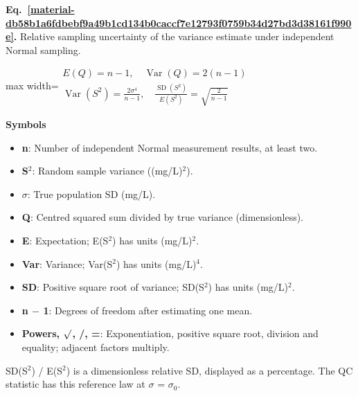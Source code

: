 \documentclass[11pt,a4paper]{article}
\begin{document}
\par\medskip
\begin{samepage}
\label{material-db58b1a6fdbebf9a49b1cd134b0caccf7e12793f0759b34d27bd3d38161f990e}
\noindent\textbf{Eq.~\ref*{material-db58b1a6fdbebf9a49b1cd134b0caccf7e12793f0759b34d27bd3d38161f990e}.} Relative sampling uncertainty of the variance estimate under independent Normal sampling.\par\nopagebreak
\begin{center}\begin{adjustbox}{max width=\linewidth}$\displaystyle \begin{gathered}E(Q)=n-1,\quad\operatorname{Var}(Q)=2(n-1)\\\operatorname{Var}(S^2)=\frac{2\sigma^4}{n-1},\quad\frac{\operatorname{SD}(S^2)}{E(S^2)}=\sqrt{\frac{2}{n-1}}\end{gathered}$\end{adjustbox}\end{center}

\par\noindent\textbf{Symbols}

\begin{itemize}\setlength{\itemsep}{1pt}\setlength{\parsep}{0pt}
\item \textbf{n}: Number of independent Normal measurement results, at least two.
\item \textbf{S\ensuremath{{}^2}}: Random sample variance ((mg/L)\ensuremath{{}^2}).
\item \textbf{\ensuremath{\sigma}}: True population SD (mg/L).
\item \textbf{Q}: Centred squared sum divided by true variance (dimensionless).
\item \textbf{E}: Expectation; E(S\ensuremath{{}^2}) has units (mg/L)\ensuremath{{}^2}.
\item \textbf{Var}: Variance; Var(S\ensuremath{{}^2}) has units (mg/L)\ensuremath{{}^4}.
\item \textbf{SD}: Positive square root of variance; SD(S\ensuremath{{}^2}) has units (mg/L)\ensuremath{{}^2}.
\item \textbf{n \ensuremath{-} 1}: Degrees of freedom after estimating one mean.
\item \textbf{Powers, \ensuremath{\sqrt{\vphantom{x}}}, /, =}: Exponentiation, positive square root, division and equality; adjacent factors multiply.
\end{itemize}

SD(S\ensuremath{{}^2}) / E(S\ensuremath{{}^2}) is a dimensionless relative SD, displayed as a percentage. The QC statistic has this reference law at \ensuremath{\sigma} = \ensuremath{\sigma}\ensuremath{{}_0}.

\end{samepage}
\medskip
\end{document}
